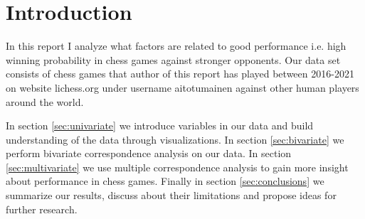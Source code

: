 \section{Introduction}

In this report I analyze what factors are related to good performance i.e. high winning probability in chess games against stronger opponents. Our data set consists of chess games that author of this report has played between 2016-2021 on website lichess.org under username aitotumainen against other human players around the world.

In section \ref{sec:univariate} we introduce variables in our data and build understanding of the data through visualizations. In section \ref{sec:bivariate} we perform bivariate correspondence analysis on our data. In section \ref{sec:multivariate} we use multiple correspondence analysis to gain more insight about performance in chess games. Finally in section \ref{sec:conclusions} we summarize our results, discuss about their limitations and propose ideas for further research.